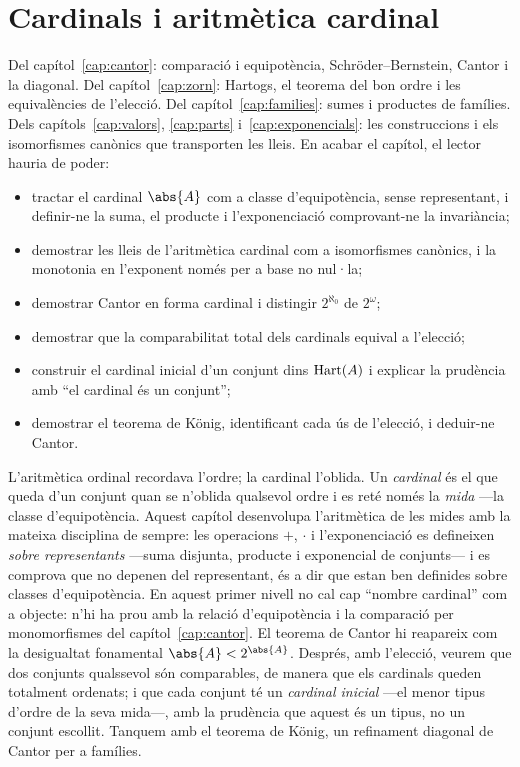 \chapter{Cardinals i aritmètica cardinal}\label{cap:cardinals}

\begin{objectius}
 Del capítol~\ref{cap:cantor}: comparació i equipotència, Schröder--Bernstein, Cantor i la diagonal. Del capítol~\ref{cap:zorn}: Hartogs, el teorema del bon ordre i les equivalències de l'elecció. Del capítol~\ref{cap:families}: sumes i productes de famílies. Dels capítols~\ref{cap:valors}, \ref{cap:parts} i~\ref{cap:exponencials}: les construccions i els isomorfismes canònics que transporten les lleis.
 En acabar el capítol, el lector hauria de poder:
\begin{itemize}
  \item tractar el cardinal \(\abs{A}\) com a classe d'equipotència, sense representant, i definir-ne la suma, el producte i l'exponenciació comprovant-ne la invariància;
  \item demostrar les lleis de l'aritmètica cardinal com a isomorfismes canònics, i la monotonia en l'exponent només per a base no nul·la;
  \item demostrar Cantor en forma cardinal i distingir \(2^{\aleph_0}\) de \(2^{\omega}\);
  \item demostrar que la comparabilitat total dels cardinals equival a l'elecció;
  \item construir el cardinal inicial d'un conjunt dins \(\operatorname{Hart}(A)\) i explicar la prudència amb \enquote{el cardinal és un conjunt};
  \item demostrar el teorema de König, identificant cada ús de l'elecció, i deduir-ne Cantor.
\end{itemize}
\end{objectius}

L'aritmètica ordinal recordava l'ordre; la cardinal l'oblida. Un
\emph{cardinal} és el que queda d'un conjunt quan se n'oblida qualsevol
ordre i es reté només la \emph{mida} ---la classe d'equipotència. Aquest
capítol desenvolupa l'aritmètica de les mides amb la mateixa disciplina de
sempre: les operacions \(+\), \(\cdot\) i l'exponenciació es defineixen
\emph{sobre representants} ---suma disjunta, producte i exponencial de
conjunts--- i es comprova que no depenen del representant, és a dir que estan
ben definides sobre classes d'equipotència. En aquest primer nivell no cal
cap \enquote{nombre cardinal} com a objecte: n'hi ha prou amb la relació
d'equipotència i la comparació per monomorfismes del capítol~\ref{cap:cantor}.
El teorema de Cantor hi reapareix com la desigualtat fonamental
\(\abs{A}<2^{\abs{A}}\). Després, amb l'elecció, veurem que dos conjunts
qualssevol són comparables, de manera que els cardinals queden totalment
ordenats; i que cada conjunt té un \emph{cardinal inicial} ---el menor tipus
d'ordre de la seva mida---, amb la prudència que aquest és un tipus, no un
conjunt escollit. Tanquem amb el teorema de König, un refinament diagonal de
Cantor per a famílies.

